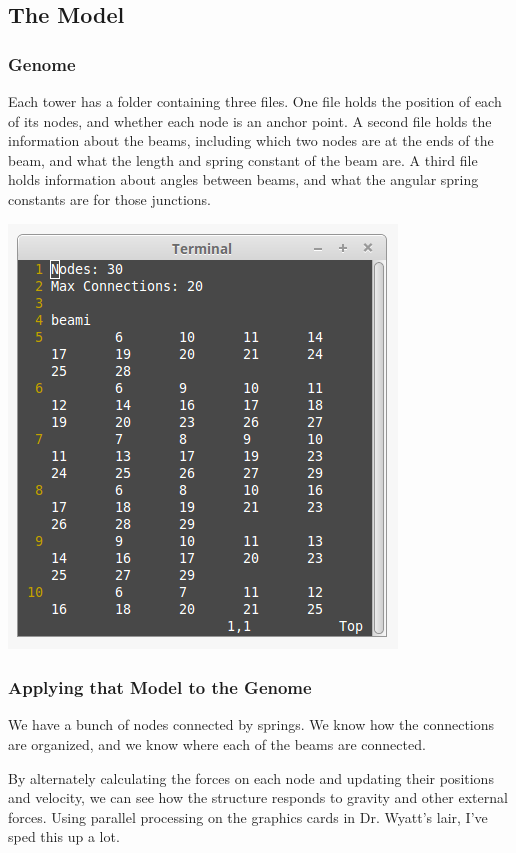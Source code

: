 \documentclass[xcolor=dvipsnames]{beamer}
\begin{document}
\begin{frame}
\section{The Model}	
\frametitle{Genome}

Each tower has a folder containing three files.  One file holds the position of each of its nodes, and whether each node is an anchor point.  A second file holds the information about the beams, including which two nodes are at the ends of the beam, and what the length and spring constant of the beam are.  A third file holds information about angles between beams, and what the angular spring constants are for those junctions.
\begin{center}
\includegraphics[scale = 0.25]{dongle.png}
\end{center}

\end{frame}

\begin{frame}
\frametitle{Applying that Model to the Genome}

We have a bunch of nodes connected by springs.  We know how the connections are organized, and we know where each of the beams are connected.

By alternately calculating the forces on each node and updating their positions and velocity, we can see how the structure responds to gravity and other external forces.  Using parallel processing on the graphics cards in Dr. Wyatt's lair, I've sped this up a lot.

\end{frame}
\end{document}
